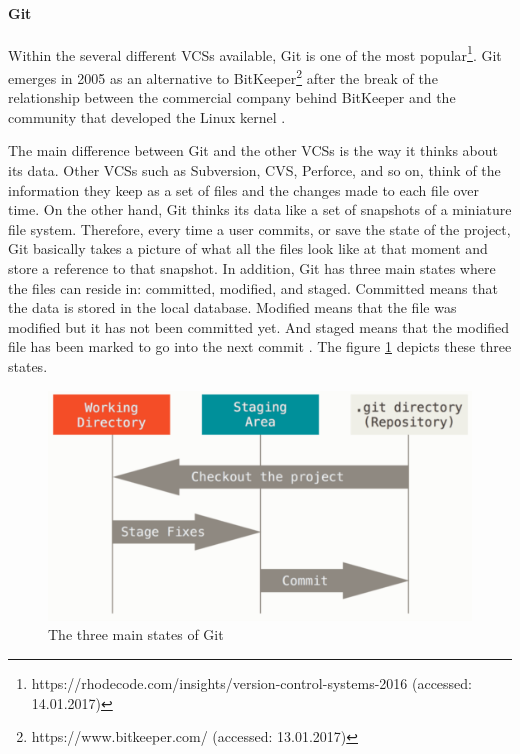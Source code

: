 \paragraph{Git}
Within the several different VCSs available, Git is one of the most popular\footnote{https://rhodecode.com/insights/version-control-systems-2016 (accessed: 14.01.2017)}. Git emerges in 2005 as an alternative to BitKeeper\footnote{https://www.bitkeeper.com/ (accessed: 13.01.2017)} after the break of the relationship between the commercial company behind BitKeeper and  the community that developed the Linux kernel \cite{Chacon2009}.

The main difference between Git and the other VCSs is the way it thinks about its data. Other VCSs such as Subversion, CVS, Perforce, and so on, think of the information they keep as a set of files and the changes made to each file over time. On the other hand, Git thinks its data like a set of snapshots of a miniature file system. Therefore, every time a user commits, or save the state of the project, Git basically takes a picture of what all the files look like at that moment and store a reference to that snapshot. In addition, Git has three main states where the files can reside in: committed, modified, and staged. Committed means that the data is stored in the local database. Modified means that the file was modified but it has not been committed yet. And staged means that the modified file has been marked to go into the next commit \cite{Chacon2009}. The figure \ref{fig:git-sates} depicts these three states.

\begin{figure}[ht]
	\centering
    \includegraphics[width=\textwidth]{grafiken/git-states}
    \caption{The three main states of Git \cite{Chacon2009}}
    \label{fig:git-sates}
\end{figure}

